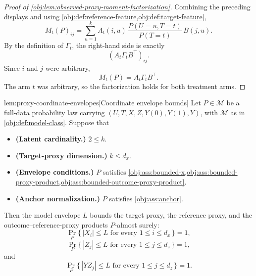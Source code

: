\documentclass[11pt]{article}
\begin{document}
\begin{proof}[Proof of \cref{obj:lem:observed-proxy-moment-factorization}]
Combining the preceding displays and using \cref{obj:def:reference-feature,obj:def:target-feature},
\[
M_t(P)_{ij}
=
\sum_{u=1}^{k}
A_t(i,u)\,
\frac{P(U=u,T=t)}{P(T=t)}\,
B(j,u).
\]
By the definition of \(\Gamma_t\), the right-hand side is exactly
\[
(A_t\Gamma_tB^\top)_{ij}.
\]
Since \(i\) and \(j\) were arbitrary,
\[
M_t(P)=A_t\Gamma_tB^\top .
\]
The arm \(t\) was arbitrary, so the factorization holds for both treatment arms.
\end{proof}

\begin{lemmav}{lem:proxy-coordinate-envelopes}[Coordinate envelope bounds]
Let \(P\in\mathcal M\) be a full-data probability law carrying \((U,T,X,Z,Y(0),Y(1),Y)\), with \(\mathcal M\) as in \cref{obj:def:model-class}.  Suppose that
\begin{itemize}
\item \textbf{(Latent cardinality.)} \(2\le k\).
\item \textbf{(Target-proxy dimension.)} \(k\le d_x\).
\item \textbf{(Envelope conditions.)} \(P\) satisfies \cref{obj:ass:bounded-x,obj:ass:bounded-proxy-product,obj:ass:bounded-outcome-proxy-product}.
\item \textbf{(Anchor normalization.)} \(P\) satisfies \cref{obj:ass:anchor}.
\end{itemize}
Then the model envelope \(L\) bounds the target proxy, the reference proxy, and the outcome--reference-proxy products \(P\)-almost surely:
\[
\Pr_P\{\,|X_i|\le L\text{ for every }1\le i\le d_x\,\}=1,
\]
\[
\Pr_P\{\,|Z_j|\le L\text{ for every }1\le j\le d_z\,\}=1,
\]
and
\[
\Pr_P\{\,|Y Z_j|\le L\text{ for every }1\le j\le d_z\,\}=1.
\]
\end{lemmav}
\end{document}
